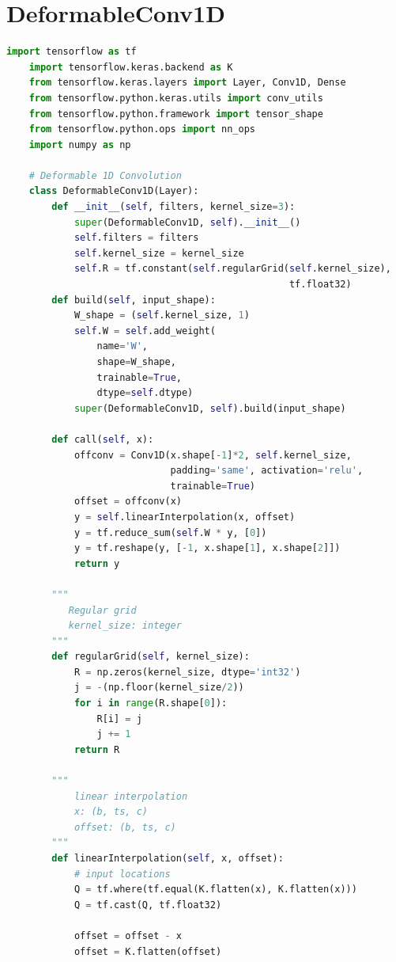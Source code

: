 \documentclass[12pt,a4paper]{report}
\begin{document}
    \section{DeformableConv1D} \label{code:def}
    \begin{lstlisting}[language=Python]
    import tensorflow as tf
    import tensorflow.keras.backend as K
    from tensorflow.keras.layers import Layer, Conv1D, Dense
    from tensorflow.python.keras.utils import conv_utils
    from tensorflow.python.framework import tensor_shape
    from tensorflow.python.ops import nn_ops
    import numpy as np
    
    # Deformable 1D Convolution
    class DeformableConv1D(Layer):
        def __init__(self, filters, kernel_size=3):
            super(DeformableConv1D, self).__init__()
            self.filters = filters
            self.kernel_size = kernel_size
            self.R = tf.constant(self.regularGrid(self.kernel_size), 
                                                  tf.float32)
        def build(self, input_shape):
            W_shape = (self.kernel_size, 1)
            self.W = self.add_weight(
                name='W',
                shape=W_shape,
                trainable=True,
                dtype=self.dtype)
            super(DeformableConv1D, self).build(input_shape)
    
        def call(self, x):
            offconv = Conv1D(x.shape[-1]*2, self.kernel_size, 
                             padding='same', activation='relu', 
                             trainable=True)
            offset = offconv(x)
            y = self.linearInterpolation(x, offset)
            y = tf.reduce_sum(self.W * y, [0])
            y = tf.reshape(y, [-1, x.shape[1], x.shape[2]])
            return y
    
        """
           Regular grid
           kernel_size: integer
        """
        def regularGrid(self, kernel_size):
            R = np.zeros(kernel_size, dtype='int32')
            j = -(np.floor(kernel_size/2))
            for i in range(R.shape[0]):
                R[i] = j
                j += 1
            return R
    
        """
            linear interpolation
            x: (b, ts, c)
            offset: (b, ts, c)
        """
        def linearInterpolation(self, x, offset):
            # input locations
            Q = tf.where(tf.equal(K.flatten(x), K.flatten(x)))
            Q = tf.cast(Q, tf.float32)
    
            offset = offset - x
            offset = K.flatten(offset)
    

\end{lstlisting}
\end{document}
